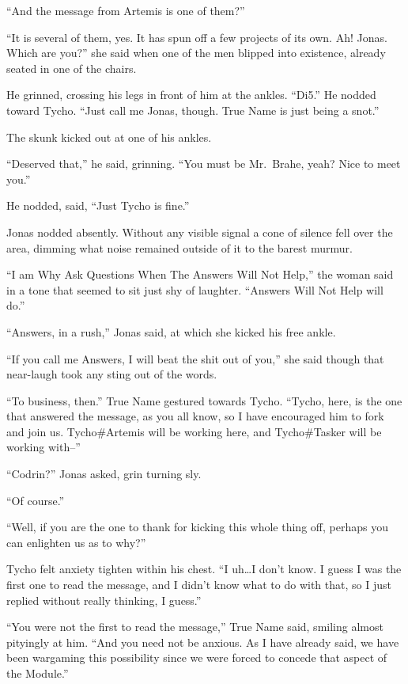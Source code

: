 ``And the message from Artemis is one of them?''

``It is several of them, yes. It has spun off a few projects of its own. Ah! Jonas. Which are you?'' she said when one of the men blipped into existence, already seated in one of the chairs.

He grinned, crossing his legs in front of him at the ankles. ``Di5.'' He nodded toward Tycho. ``Just call me Jonas, though. True Name is just being a snot.''

The skunk kicked out at one of his ankles.

``Deserved that,'' he said, grinning. ``You must be Mr.~Brahe, yeah? Nice to meet you.''

He nodded, said, ``Just Tycho is fine.''

Jonas nodded absently. Without any visible signal a cone of silence fell over the area, dimming what noise remained outside of it to the barest murmur.

``I am Why Ask Questions When The Answers Will Not Help,'' the woman said in a tone that seemed to sit just shy of laughter. ``Answers Will Not Help will do.''

``Answers, in a rush,'' Jonas said, at which she kicked his free ankle.

``If you call me Answers, I will beat the shit out of you,'' she said though that near-laugh took any sting out of the words.

``To business, then.'' True Name gestured towards Tycho. ``Tycho, here, is the one that answered the message, as you all know, so I have encouraged him to fork and join us. Tycho\#Artemis will be working here, and Tycho\#Tasker will be working with--''

``Codrin?'' Jonas asked, grin turning sly.

``Of course.''

``Well, if you are the one to thank for kicking this whole thing off, perhaps you can enlighten us as to why?''

Tycho felt anxiety tighten within his chest. ``I uh\ldots I don't know. I guess I was the first one to read the message, and I didn't know what to do with that, so I just replied without really thinking, I guess.''

``You were not the first to read the message,'' True Name said, smiling almost pityingly at him. ``And you need not be anxious. As I have already said, we have been wargaming this possibility since we were forced to concede that aspect of the Module.''

